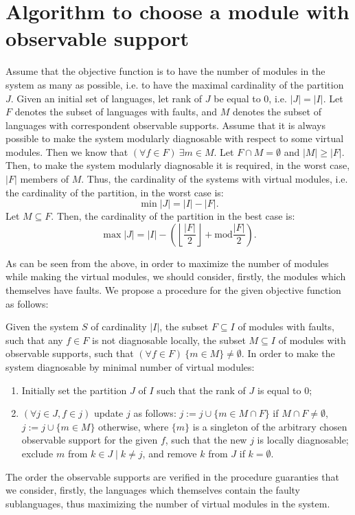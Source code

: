 \documentclass[a4paper, 10pt, conference]{ieeeconf}
\begin{document}
\section{Algorithm to choose a module with observable support}
Assume that the objective function is to have the number of modules in the
system as many as possible, i.e. to have the maximal cardinality of the
partition $J$.
Given an initial set of languages, let rank of $J$ be equal to 0, i.e. $|J| =
|I|$. Let $F$ denotes the subset of languages with faults, and $M$ denotes the
subset of languages with correspondent observable supports.
Assume that it is always possible to make the system modularly diagnosable with
respect to some virtual modules. Then we know that $(\forall f \in F)~\exists m
\in M$. Let $F \cap M = \emptyset$ and $|M| \geq |F|$. Then, to make the system
modularly diagnosable it is required, in the worst case, $|F|$ members of $M$.
Thus, the cardinality of the systems with virtual modules, i.e. the cardinality
of the partition, in the worst case is:
\begin{equation}
	\min |J| = |I| - |F|.
\end{equation}
Let $M \subseteq F$. Then, the cardinality of the partition in the best case
is:
\begin{equation}
	\max |J| = |I| - \left(
		\left\lfloor \frac{|F|}{2} \right\rfloor + \textrm{mod} \frac{|F|}{2}
		\right). 
\end{equation}

As can be seen from the above, in order to maximize the number of modules while
making the virtual modules, we should consider, firstly, the modules which
themselves have faults. We propose a procedure for the given objective function
as follows:

Given the system $S$ of cardinality $|I|$, the subset $F
\subseteq I$ of modules with faults, such that any $f\in F$ is not diagnosable
locally, the subset $M \subseteq I$ of modules with observable supports, such
that $(\forall f \in F)~\{m \in M\}\neq \emptyset$. In order to make the system
diagnosable by minimal number of virtual modules: 
\begin{enumerate}
  \item Initially set the partition $J$ of $I$ such that the rank of $J$ is
  equal to 0;
  \item $(\forall j \in J, f \in j)$ update $j$ as follows: 
  	$j := j \cup \{m \in M \cap F\}$ if $M \cap F \neq \emptyset$,
 $j := j \cup \{m \in M\}$ otherwise, where $\{m\}$ is a singleton of the
 arbitrary chosen observable support for the given $f$, such that the new $j$
 is locally diagnosable; exclude $m$ from $k \in J \mid k \neq j$, and remove
 $k$ from $J$ if $k=\emptyset$.
\end{enumerate} 
The order the observable supports are verified in the procedure guaranties that
we consider, firstly, the languages which themselves contain the faulty
sublanguages, thus maximizing the number of virtual modules in the system.
\end{document}
